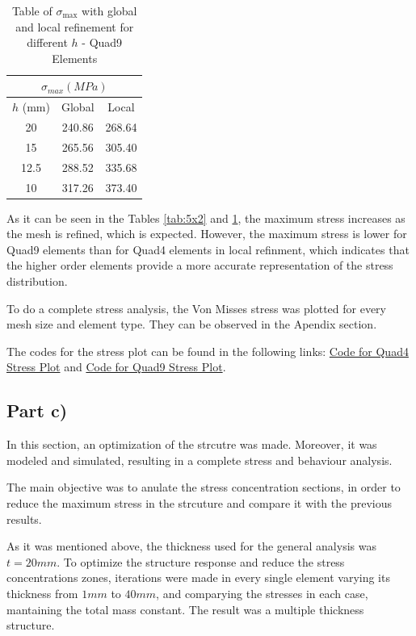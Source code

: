 \begin{table}[H]
  \centering
\caption{Table of $\sigma_{\max}$ with global and local refinement for different $h$ - Quad9 Elements}
  \begin{tabular}{|c|c|c|}
    \hline
    \multicolumn{3}{|c|}{$\sigma_{max} (MPa)$} \\ \hline
    $h$ (mm) & Global & Local \\ \hline
    20 & 240.86 & 268.64 \\ \hline
    15 & 265.56 & 305.40 \\ \hline
    12.5 & 288.52 & 335.68 \\ \hline
    10 & 317.26 & 373.40 \\ \hline
  \end{tabular}
  \label{tab:12}
\end{table}

As it can be seen in the Tables \ref{tab:5x2} and \ref{tab:12}, the maximum stress increases as the mesh is refined, which is expected. However, the maximum stress is lower for Quad9 elements than for Quad4 elements in local refinment, which indicates that the higher order elements provide a more accurate representation of the stress distribution.

To do a complete stress analysis, the Von Misses stress was plotted for every mesh size and element type. They can be observed in the Apendix section. 

The codes for the stress plot can be found in the following links: \href{https://github.com/LukasWolff2002/TAREA_3_FINITE/blob/main/ENTREGA_2/QUAD4/graph.py}{Code for Quad4 Stress Plot} and \href{https://github.com/LukasWolff2002/TAREA_3_FINITE/blob/main/ENTREGA_2/QUAD9/graph.py}{Code for Quad9 Stress Plot}.

\subsection{Part c)}

In this section, an optimization of the strcutre was made. Moreover, it was modeled and simulated, resulting in a complete stress and behaviour analysis.

The main objective was to anulate the stress concentration sections, in order to reduce the maximum stress in the strcuture and compare it with the previous results.

As it was mentioned above, the thickness used for the general analysis was $t=20mm$. To optimize the structure response and reduce the stress concentrations zones, iterations were made in every single element varying its thickness from $1mm$ to $40mm$, and comparying the stresses in each case, mantaining the total mass constant. The result was a multiple thickness structure.

